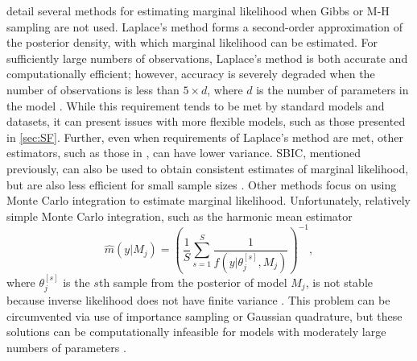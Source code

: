 \documentclass[twocolumn]{article}
\begin{document}
\cite{KassRaftery} detail several methods for estimating marginal likelihood when Gibbs or M-H sampling are not used. Laplace's method forms a second-order approximation of the posterior density, with which marginal likelihood can be estimated. For sufficiently large numbers of observations, Laplace's method is both accurate and computationally efficient; however, accuracy is severely degraded when the number of observations is less than $5\times d$, where $d$ is the number of parameters in the model \citep{Slate}. While this requirement tends to be met by standard models and datasets, it can present issues with more flexible models, such as those presented in \cref{sec:SF}. Further, even when requirements of Laplace's method are met, other estimators, such as those in \cite{Chib}, can have lower variance. SBIC, mentioned previously, can also be used to obtain consistent estimates of marginal likelihood, but are also less efficient for small sample sizes \citep{Bollen}. Other methods focus on using Monte Carlo integration to estimate marginal likelihood. Unfortunately, relatively simple Monte Carlo integration, such as the harmonic mean estimator
\begin{equation}
	\hat{m}(y|M_j) = \left(\frac{1}{S} \sum_{s=1}^S \frac{1}{f(y|\theta_j^{[s]}, M_j)}\right)^{-1},
\end{equation}
where $\theta_j^{[s]}$ is the $s$th sample from the posterior of model $M_j$, is not stable because inverse likelihood does not have finite variance \citep{NewtonRaferty}. This problem can be circumvented via use of importance sampling or Gaussian quadrature, but these solutions can be computationally infeasible for models with moderately large numbers of parameters \citep{GenzKass}.
\end{document}

